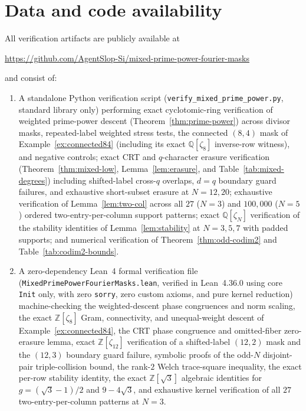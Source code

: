 \documentclass[11pt,reqno]{amsart}
\numberwithin{equation}{section}
\theoremstyle{definition}
\theoremstyle{remark}
\newcommand{\Q}{\mathbb{Q}}
\newcommand{\Z}{\mathbb{Z}}
\begin{document}
\section*{Data and code availability}
All verification artifacts are publicly available at
\begin{center}
\url{https://github.com/AgentSlop-Si/mixed-prime-power-fourier-masks}
\end{center}
and consist of:
\begin{enumerate}[label=(\arabic*),leftmargin=2em]
\item A standalone Python verification script (\texttt{verify\_mixed\_prime\_power.py}, standard library only) performing exact cyclotomic-ring verification of weighted prime-power descent (Theorem~\ref{thm:prime-power}) across divisor masks, repeated-label weighted stress tests, the connected $(8,4)$ mask of Example~\ref{ex:connected84} (including its exact $\Q[\zeta_8]$ inverse-row witness), and negative controls; exact CRT and $q$-character erasure verification (Theorem~\ref{thm:mixed-low}, Lemma~\ref{lem:erasure}, and Table~\ref{tab:mixed-degrees}) including shifted-label cross-$q$ overlaps, $d=q$ boundary guard failures, and exhaustive short-subset erasure at $N=12,20$; exhaustive verification of Lemma~\ref{lem:two-col} across all $27$ ($N=3$) and $100{,}000$ ($N=5$) ordered two-entry-per-column support patterns; exact $\Q[\zeta_N]$ verification of the stability identities of Lemma~\ref{lem:stability} at $N=3,5,7$ with padded supports; and numerical verification of Theorem~\ref{thm:odd-codim2} and Table~\ref{tab:codim2-bounds}.
\item A zero-dependency Lean~4 formal verification file (\texttt{MixedPrimePowerFourierMasks.lean}, verified in Lean~4.36.0 using core \texttt{Init} only, with zero \texttt{sorry}, zero custom axioms, and pure kernel reduction) machine-checking the weighted-descent phase congruences and norm scaling, the exact $\Z[\zeta_8]$ Gram, connectivity, and unequal-weight descent of Example~\ref{ex:connected84}, the CRT phase congruence and omitted-fiber zero-erasure lemma, exact $\Z[\zeta_{12}]$ verification of a shifted-label $(12,2)$ mask and the $(12,3)$ boundary guard failure, symbolic proofs of the odd-$N$ disjoint-pair triple-collision bound, the rank-$2$ Welch trace-square inequality, the exact per-row stability identity, the exact $\Z[\sqrt{3}]$ algebraic identities for $g=(\sqrt{3}-1)/2$ and $9-4\sqrt{3}$, and exhaustive kernel verification of all $27$ two-entry-per-column patterns at $N=3$.
\end{enumerate}



\end{document}

